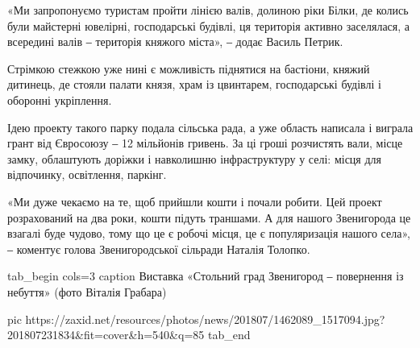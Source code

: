 «Ми запропонуємо туристам пройти лінією валів, долиною ріки Білки, де колись
були майстерні ювелірні, господарські будівлі, ця територія активно заселялася,
а всередині валів ‒ територія княжого міста», ‒ додає Василь Петрик.

Стрімкою стежкою уже нині є можливість піднятися на бастіони, княжий дитинець,
де стояли палати князя, храм із цвинтарем, господарські будівлі і оборонні
укріплення.

Ідею проекту такого парку подала сільська рада, а уже область написала і
виграла грант від Євросоюзу ‒ 12 мільйонів гривень. За ці гроші розчистять
вали, місце замку, облаштують доріжки і навколишню інфраструктуру у селі: місця
для відпочинку, освітлення, паркінг.

«Ми дуже чекаємо на те, щоб прийшли кошти і почали робити. Цей проект
розрахований на два роки, кошти підуть траншами. А для нашого Звенигорода це
взагалі буде чудово, тому що це є робочі місця, це є популяризація нашого
села», ‒ коментує голова Звенигородської сільради Наталія Толопко.

\ifcmt
	tab_begin cols=3
		caption Виставка «Стольний град Звенигород ‒ повернення із небуття» (фото Віталія Грабара)

		pic https://zaxid.net/resources/photos/news/201807/1462089_1517094.jpg?201807231834&fit=cover&h=540&q=85
	tab_end
\fi
